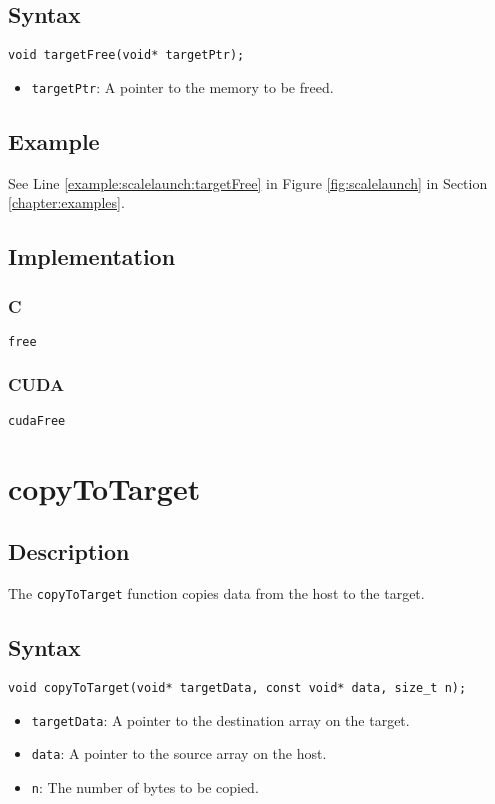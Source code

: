 \subsection{Syntax}
\begin{verbatim}
void targetFree(void* targetPtr);
\end{verbatim}

\begin{itemize}
\item \verb+targetPtr+: A pointer to the memory to be freed.
\end{itemize}


\subsection{Example}
See Line \ref{example:scalelaunch:targetFree} in Figure \ref{fig:scalelaunch} in Section \ref{chapter:examples}.

\subsection{Implementation}
\subsubsection{C}
\verb+free+
\subsubsection{CUDA}
\verb+cudaFree+

\newpage
\section{copyToTarget}

\subsection{Description}

The \verb+copyToTarget+ function copies data from the host to the target.

\subsection{Syntax}
\begin{verbatim}
void copyToTarget(void* targetData, const void* data, size_t n);
\end{verbatim}

\begin{itemize}
\item \verb+targetData+: A pointer to the destination array on the target.
\item \verb+data+: A pointer to the source array on the host.
\item \verb+n+: The number of bytes to be copied.
\end{itemize}


